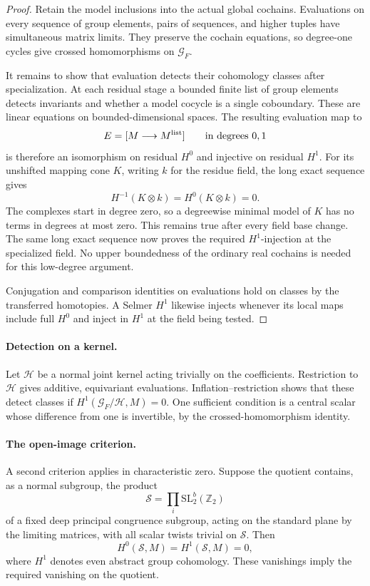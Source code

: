 \begin{proof}
Retain the model inclusions into the actual global cochains. Evaluations
on every sequence of group elements, pairs of sequences, and higher tuples
have simultaneous matrix limits. They preserve the cochain equations, so
degree-one cycles give crossed homomorphisms on \(\mathcal G_F\).

It remains to show that evaluation detects their cohomology classes after
specialization. At each residual stage a bounded finite list of group
elements detects invariants and whether a model cocycle is a single
coboundary. These are linear equations on bounded-dimensional spaces.
The resulting evaluation map to
\[
                         E=[M\longrightarrow M^{\rm list}]
                         \qquad\text{in degrees }0,1
\]
is therefore an isomorphism on residual \(H^0\) and injective on residual
\(H^1\). For its unshifted mapping cone \(K\), writing \(k\) for the
residue field, the long exact sequence gives
\[
                         H^{-1}(K\otimes k)=H^0(K\otimes k)=0.
\]
The complexes start in degree zero, so a degreewise minimal model of
\(K\) has no terms in degrees at most zero. This remains true after every
field base change. The same long exact sequence now proves the required
\(H^1\)-injection at the specialized field. No upper boundedness of the
ordinary real cochains is needed for this low-degree argument.

Conjugation and comparison identities on evaluations hold on classes by
the transferred homotopies. A Selmer \(H^1\) likewise injects whenever its
local maps include full \(H^0\) and inject in \(H^1\) at the field being
tested.
\end{proof}

\paragraph{Detection on a kernel.}
Let \(\mathcal H\) be a normal joint kernel acting trivially on the
coefficients. Restriction to \(\mathcal H\) gives additive, equivariant
evaluations. Inflation--restriction shows that these detect classes if
\(H^1(\mathcal G_F/\mathcal H,M)=0\). One sufficient condition is a central
scalar whose difference from one is invertible, by the crossed-homomorphism
identity.

\paragraph{The open-image criterion.}
A second criterion applies in characteristic zero. Suppose the quotient
contains, as a normal subgroup, the product
\[
                   \mathcal S=\prod_i\mathrm{SL}_2^b(\mathbb Z_2)
\]
of a fixed deep principal congruence subgroup, acting on the standard
plane by the limiting matrices, with all scalar twists trivial on
\(\mathcal S\). Then
\[
                         H^0(\mathcal S,M)=H^1(\mathcal S,M)=0,
\]
where \(H^1\) denotes even abstract group cohomology. These vanishings imply
the required vanishing on the quotient.

